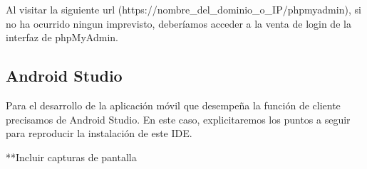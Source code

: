 \documentclass[11pt,spanish,
		listoftables,listoffigures]
		{tfgplantilla}
\begin{document}
Al visitar la siguiente url (https://nombre\_del\_dominio\_o\_IP/phpmyadmin), si no ha ocurrido ningun imprevisto, deberíamos acceder a la venta de login de la interfaz de phpMyAdmin.

\subsection {Android Studio}

Para el desarrollo de la aplicación móvil que desempeña la función de cliente precisamos de Android Studio. En este caso, explicitaremos los puntos a seguir para reproducir la instalación de este IDE.

**Incluir capturas de pantalla


\end{document}

